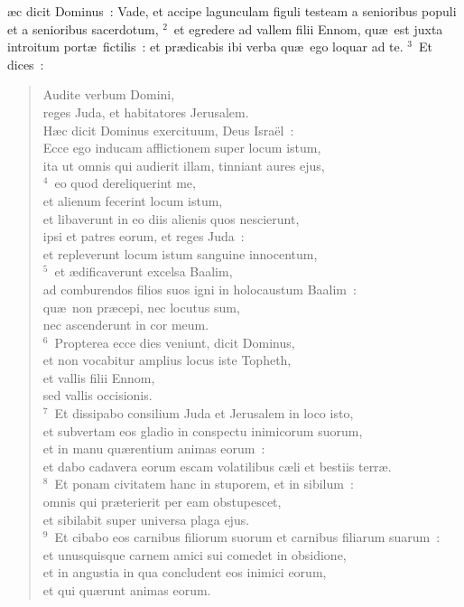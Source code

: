 \bchapter
{}\ae c dicit Dominus~: Vade, et accipe lagunculam figuli testeam a senioribus populi et a senioribus sacerdotum,
${}^{2}$~et egredere ad vallem filii Ennom, qu\ae\ est juxta introitum port\ae\ fictilis~: et pr\ae dicabis ibi verba qu\ae\ ego loquar ad te.
${}^{3}$~Et dices~: \begin{verse}Audite verbum Domini,\\ reges Juda, et habitatores Jerusalem.\\ H\ae c dicit Dominus exercituum, Deus Isra\"el~:\\ Ecce ego inducam afflictionem super locum istum,\\ ita ut omnis qui audierit illam, tinniant aures ejus,\\
${}^{4}$~eo quod dereliquerint me,\\ et alienum fecerint locum istum,\\ et libaverunt in eo diis alienis quos nescierunt,\\ ipsi et patres eorum, et reges Juda~:\\ et repleverunt locum istum sanguine innocentum,\\
${}^{5}$~et \ae dificaverunt excelsa Baalim,\\ ad comburendos filios suos igni in holocaustum Baalim~:\\ qu\ae\ non pr\ae cepi, nec locutus sum,\\ nec ascenderunt in cor meum.\\
${}^{6}$~Propterea ecce dies veniunt, dicit Dominus,\\ et non vocabitur amplius locus iste Topheth,\\ et vallis filii Ennom,\\ sed vallis occisionis.\\
${}^{7}$~Et dissipabo consilium Juda et Jerusalem in loco isto,\\ et subvertam eos gladio in conspectu inimicorum suorum,\\ et in manu qu\ae rentium animas eorum~:\\ et dabo cadavera eorum escam volatilibus c\ae li et bestiis terr\ae .\\
${}^{8}$~Et ponam civitatem hanc in stuporem, et in sibilum~:\\ omnis qui pr\ae terierit per eam obstupescet,\\ et sibilabit super universa plaga ejus.\\
${}^{9}$~Et cibabo eos carnibus filiorum suorum et carnibus filiarum suarum~:\\ et unusquisque carnem amici sui comedet in obsidione,\\ et in angustia in qua concludent eos inimici eorum,\\ et qui qu\ae runt animas eorum.\end{verse}



